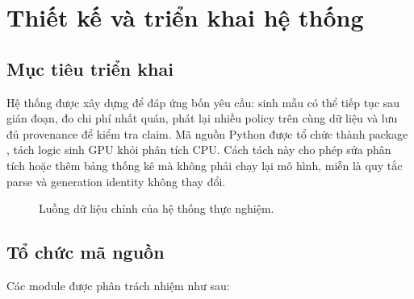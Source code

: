 \chapter{Thiết kế và triển khai hệ thống}
\label{chap:implementation}

\section{Mục tiêu triển khai}

Hệ thống được xây dựng để đáp ứng bốn yêu cầu: sinh mẫu có thể tiếp tục sau gián đoạn,
đo chi phí nhất quán, phát lại nhiều policy trên cùng dữ liệu và lưu đủ provenance để
kiểm tra claim. Mã nguồn Python được tổ chức thành package ,
tách logic sinh GPU khỏi phân tích CPU. Cách tách này cho phép sửa phân tích hoặc thêm
bảng thống kê mà không phải chạy lại mô hình, miễn là quy tắc parse và generation
identity không thay đổi.

\begin{figure}[htbp]
  \centering
  \caption{Luồng dữ liệu chính của hệ thống thực nghiệm.}
  \label{fig:system-pipeline}
\end{figure}

\section{Tổ chức mã nguồn}

Các module được phân trách nhiệm như sau:

